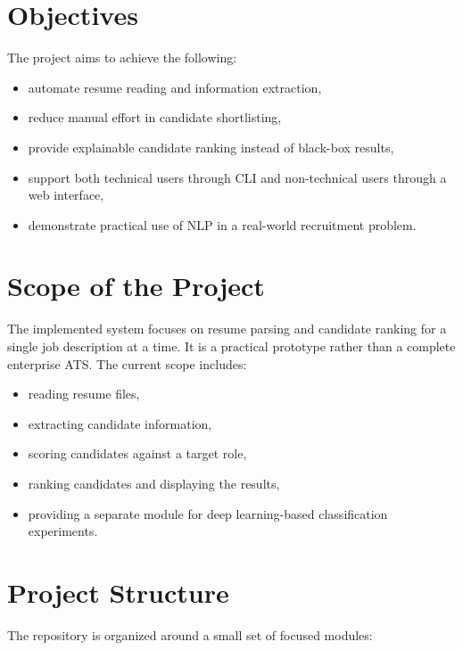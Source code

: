 \documentclass[12pt,a4paper]{article}
\begin{document}
\section{Objectives}
The project aims to achieve the following:

\begin{itemize}[leftmargin=1.5em]
    \item automate resume reading and information extraction,
    \item reduce manual effort in candidate shortlisting,
    \item provide explainable candidate ranking instead of black-box results,
    \item support both technical users through CLI and non-technical users through a web interface,
    \item demonstrate practical use of NLP in a real-world recruitment problem.
\end{itemize}

\section{Scope of the Project}
The implemented system focuses on resume parsing and candidate ranking for a single job description at a time. It is a practical prototype rather than a complete enterprise ATS. The current scope includes:

\begin{itemize}[leftmargin=1.5em]
    \item reading resume files,
    \item extracting candidate information,
    \item scoring candidates against a target role,
    \item ranking candidates and displaying the results,
    \item providing a separate module for deep learning-based classification experiments.
\end{itemize}

\section{Project Structure}
The repository is organized around a small set of focused modules:
\end{document}
